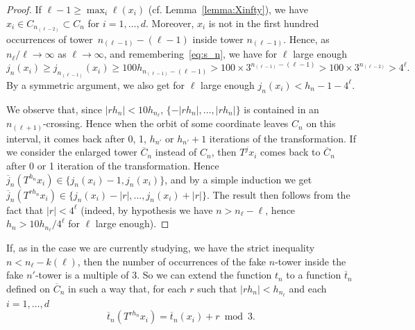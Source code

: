 \documentclass[AHL,Unicode,longabstracts]{cedram}
\begin{document}
\goodbreak
\begin{proof}
If $\ell-1\ge \max_i \ell(x_i)$ (cf. Lemma~\ref{lemma:Xinfty}), we have $x_i\in C_{n_{(\ell-2)}} \subset C_n$ for $i=1,\ldots,d$. Moreover, $x_i$ is not in the first hundred occurrences of tower~$n_{(\ell-1)}-(\ell-1)$ inside tower $n_{(\ell-1)}$. Hence, as $n_\ell/\ell\to\infty$ as $\ell\to\infty$, and remembering~\eqref{eq:s_n}, we have for $\ell$ large enough
\[
j_n(x_i) \ge j_{n_{(\ell-1)}}(x_i) \ge 100 h_{n_{(\ell-1)}-(\ell-1)} > 100\times 3^{n_{(\ell-1)}-(\ell-1)} > 100\times 3^{n_{(\ell-2)}} > 4^\ell.
\]
By a symmetric argument, we also get for $\ell$ large enough $j_n(x_i)<h_n-1-4^\ell$.

We observe that, since $|rh_n|<10 h_{n_\ell}$, $\{-|rh_n|,\ldots,|rh_n|\}$ is contained in an $n_{(\ell+1)}$-crossing. Hence when the orbit of some coordinate leaves $C_n$ on this interval, it comes back after 0, 1, $h_{n'}$ or $h_{n'}+1$ iterations of the transformation. If we consider the enlarged tower $\overline{C}_n$ instead of $C_n$, then $T^jx_i$ comes back to $\overline{C}_n$ after 0 or 1 iteration of the transformation. Hence $\overline{j}_n \left(T^{h_n} x_i \right)\in \{j_n(x_i)-1, j_n(x_i)\}$, and by a simple induction we get $\overline{j}_n \left(T^{rh_n} x_i \right)\in \{j_n(x_i)-|r|,\ldots, j_n(x_i)+|r|\}$. The result then follows from the fact that $|r|<4^{\ell}$ (indeed, by hypothesis we have $n>n_\ell-\ell$, hence $h_n>10 h_{n_\ell}/4^\ell$ for $\ell$ large enough).
\end{proof}

\begin{rema}\label{remark:fake-t_n}
If, as in the case we are currently studying, we have the strict inequality $n< n_\ell-k(\ell)$, then the number of occurrences of the fake $n$-tower inside the fake $n'$-tower is a multiple of 3. So we can extend the function $t_n$ to a function $\overline{t}_n$ defined on $\overline{C}_n$ in such a way that, for each $r$ such that $|rh_n|<h_{n_\ell}$ and each $i=1,\ldots,d$
\[
\overline{t}_n \left(T^{rh_n} x_i\right) = \overline{t}_n (x_i) + r \bmod 3.
\]
\end{rema}
\end{document}
